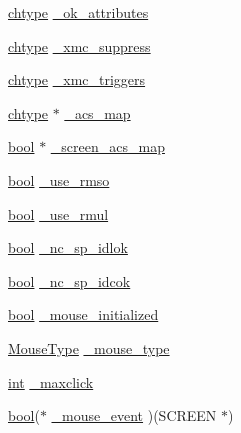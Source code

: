 \begin{DoxyCompactItemize}
\item 
\hyperlink{curses_8priv_8h_ad21482314c581139d01159829e841e51}{chtype} \hyperlink{structscreen_aae21f59258a674bf6a8d8f666083b956}{\-\_\-ok\-\_\-attributes}
\item 
\hyperlink{curses_8priv_8h_ad21482314c581139d01159829e841e51}{chtype} \hyperlink{structscreen_ad468a5a36e5a33de3c81287daa6f6160}{\-\_\-xmc\-\_\-suppress}
\item 
\hyperlink{curses_8priv_8h_ad21482314c581139d01159829e841e51}{chtype} \hyperlink{structscreen_a0b64261227c91450ad3806fff2b1b1f0}{\-\_\-xmc\-\_\-triggers}
\item 
\hyperlink{curses_8priv_8h_ad21482314c581139d01159829e841e51}{chtype} $\ast$ \hyperlink{structscreen_a0304cb5935007bd733b008b1410592d6}{\-\_\-acs\-\_\-map}
\item 
\hyperlink{term__entry_8h_a002004ba5d663f149f6c38064926abac}{bool} $\ast$ \hyperlink{structscreen_a30fbe70d423d2e690c7f1a445bd2c02e}{\-\_\-screen\-\_\-acs\-\_\-map}
\item 
\hyperlink{term__entry_8h_a002004ba5d663f149f6c38064926abac}{bool} \hyperlink{structscreen_a1e21aef9b18a4684a1bff4849d69dc9d}{\-\_\-use\-\_\-rmso}
\item 
\hyperlink{term__entry_8h_a002004ba5d663f149f6c38064926abac}{bool} \hyperlink{structscreen_a852b9ab77875602817d0efa57b676b8e}{\-\_\-use\-\_\-rmul}
\item 
\hyperlink{term__entry_8h_a002004ba5d663f149f6c38064926abac}{bool} \hyperlink{structscreen_a218ab02fba29e0b5477e5cb12eb9bc42}{\-\_\-nc\-\_\-sp\-\_\-idlok}
\item 
\hyperlink{term__entry_8h_a002004ba5d663f149f6c38064926abac}{bool} \hyperlink{structscreen_a87446f745d08c7c40e3e476848942551}{\-\_\-nc\-\_\-sp\-\_\-idcok}
\item 
\hyperlink{term__entry_8h_a002004ba5d663f149f6c38064926abac}{bool} \hyperlink{structscreen_a703c607e489cd984249df49d68cc55df}{\-\_\-mouse\-\_\-initialized}
\item 
\hyperlink{curses_8priv_8h_a1a15f1712ba14a6877038ffe9c6f7708}{Mouse\-Type} \hyperlink{structscreen_aa4333a18a4deaf956b6c7b89601ed3dc}{\-\_\-mouse\-\_\-type}
\item 
\hyperlink{term__entry_8h_ad65b480f8c8270356b45a9890f6499ae}{int} \hyperlink{structscreen_a9f6cd1b52860c3386335f780ecf8ce5b}{\-\_\-maxclick}
\item 
\hyperlink{term__entry_8h_a002004ba5d663f149f6c38064926abac}{bool}($\ast$ \hyperlink{structscreen_a0d90df4205bbf5124ff7a6ecf7c63b01}{\-\_\-mouse\-\_\-event} )(S\-C\-R\-E\-E\-N $\ast$)

\end{DoxyCompactItemize}
